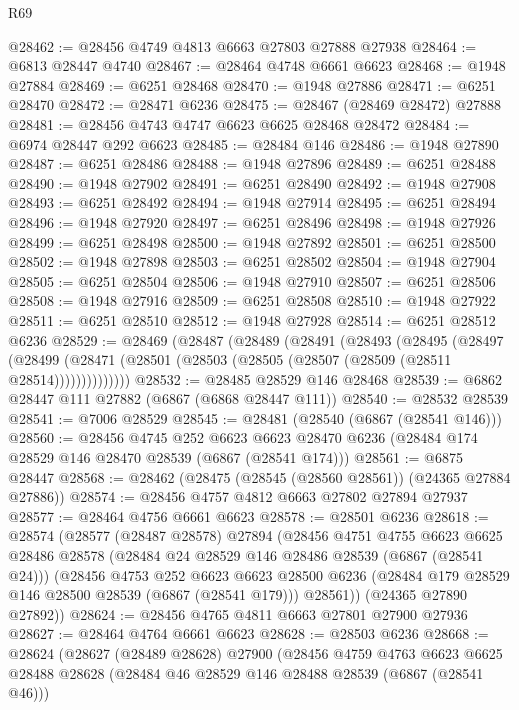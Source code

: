 \begin{lexlean}{R69}
\begin{coremodule}
{@28462 := @28456 @4749 @4813 @6663 @27803 @27888 @27938
@28464 := @6813 @28447 @4740
@28467 := @28464 @4748 @6661 @6623
@28468 := @1948 @27884
@28469 := @6251 @28468
@28470 := @1948 @27886
@28471 := @6251 @28470
@28472 := @28471 @6236
@28475 := @28467 (@28469 @28472) @27888
@28481 := @28456 @4743 @4747 @6623 @6625 @28468 @28472
@28484 := @6974 @28447 @292 @6623
@28485 := @28484 @146
@28486 := @1948 @27890
@28487 := @6251 @28486
@28488 := @1948 @27896
@28489 := @6251 @28488
@28490 := @1948 @27902
@28491 := @6251 @28490
@28492 := @1948 @27908
@28493 := @6251 @28492
@28494 := @1948 @27914
@28495 := @6251 @28494
@28496 := @1948 @27920
@28497 := @6251 @28496
@28498 := @1948 @27926
@28499 := @6251 @28498
@28500 := @1948 @27892
@28501 := @6251 @28500
@28502 := @1948 @27898
@28503 := @6251 @28502
@28504 := @1948 @27904
@28505 := @6251 @28504
@28506 := @1948 @27910
@28507 := @6251 @28506
@28508 := @1948 @27916
@28509 := @6251 @28508
@28510 := @1948 @27922
@28511 := @6251 @28510
@28512 := @1948 @27928
@28514 := @6251 @28512 @6236
@28529 := @28469
    (@28487
      (@28489
        (@28491
          (@28493
            (@28495
              (@28497
                (@28499 (@28471 (@28501 (@28503 (@28505 (@28507 (@28509 (@28511 @28514))))))))))))))
@28532 := @28485 @28529 @146 @28468
@28539 := @6862 @28447 @111 @27882 (@6867 (@6868 @28447 @111))
@28540 := @28532 @28539
@28541 := @7006 @28529
@28545 := @28481 (@28540 (@6867 (@28541 @146)))
@28560 := @28456
    @4745
    @252
    @6623
    @6623
    @28470
    @6236
    (@28484 @174 @28529 @146 @28470 @28539 (@6867 (@28541 @174)))
@28561 := @6875 @28447
@28568 := @28462 (@28475 (@28545 (@28560 @28561)) (@24365 @27884 @27886))
@28574 := @28456 @4757 @4812 @6663 @27802 @27894 @27937
@28577 := @28464 @4756 @6661 @6623
@28578 := @28501 @6236
@28618 := @28574
    (@28577
      (@28487 @28578)
      @27894
      (@28456
        @4751
        @4755
        @6623
        @6625
        @28486
        @28578
        (@28484 @24 @28529 @146 @28486 @28539 (@6867 (@28541 @24)))
        (@28456
          @4753
          @252
          @6623
          @6623
          @28500
          @6236
          (@28484 @179 @28529 @146 @28500 @28539 (@6867 (@28541 @179)))
          @28561))
      (@24365 @27890 @27892))
@28624 := @28456 @4765 @4811 @6663 @27801 @27900 @27936
@28627 := @28464 @4764 @6661 @6623
@28628 := @28503 @6236
@28668 := @28624
    (@28627
      (@28489 @28628)
      @27900
      (@28456
        @4759
        @4763
        @6623
        @6625
        @28488
        @28628
        (@28484 @46 @28529 @146 @28488 @28539 (@6867 (@28541 @46)))
}
\end{coremodule}
\end{lexlean}
